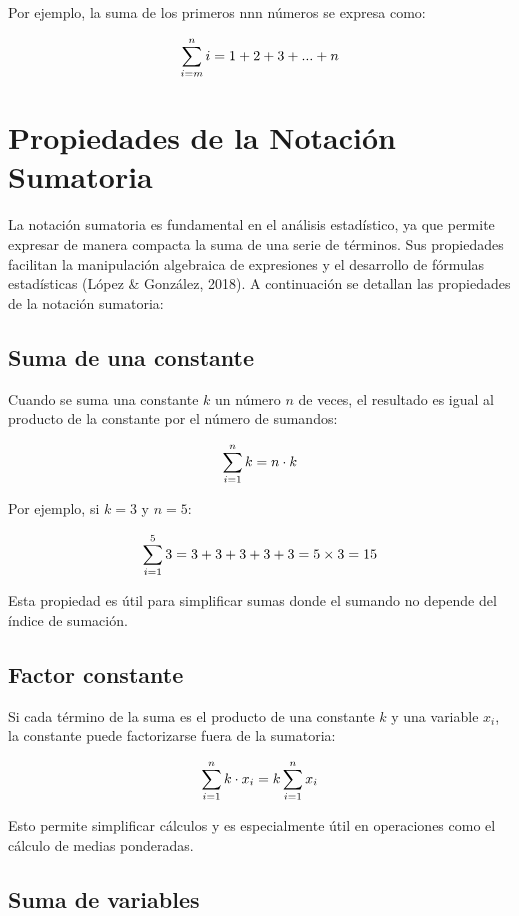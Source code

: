 \documentclass[
  spanish,
  letterpaper,
]{book}
\begin{document}
Por ejemplo, la suma de los primeros nnn números se expresa como:

\[\huge\sum_{i=m}^{n} i=1+2+3+...+n\]

\section{Propiedades de la Notación
Sumatoria}\label{propiedades-de-la-notaciuxf3n-sumatoria}

La notación sumatoria es fundamental en el análisis estadístico, ya que
permite expresar de manera compacta la suma de una serie de términos.
Sus propiedades facilitan la manipulación algebraica de expresiones y el
desarrollo de fórmulas estadísticas (López \& González, 2018). A
continuación se detallan las propiedades de la notación sumatoria:

\subsection{Suma de una constante}\label{suma-de-una-constante}

Cuando se suma una constante \(k\) un número \(n\) de veces, el
resultado es igual al producto de la constante por el número de
sumandos:

\[{\huge \sum_{i=1}^{n} k = n \cdot k}\]

Por ejemplo, si \(k = 3\) y \(n = 5\):

\[{\huge \sum_{i=1}^{5} 3 = 3 + 3 + 3 + 3 + 3 = 5 \times 3 = 15}\]

Esta propiedad es útil para simplificar sumas donde el sumando no
depende del índice de sumación.

\subsection{Factor constante}\label{factor-constante}

Si cada término de la suma es el producto de una constante \(k\) y una
variable \(x_i\)\hspace{0pt}, la constante puede factorizarse fuera de
la sumatoria:

\[{\huge \sum_{i=1}^{n} k \cdot x_i = k \sum_{i=1}^{n} x_i}\]

Esto permite simplificar cálculos y es especialmente útil en operaciones
como el cálculo de medias ponderadas.

\subsection{Suma de variables}\label{suma-de-variables}
\end{document}
